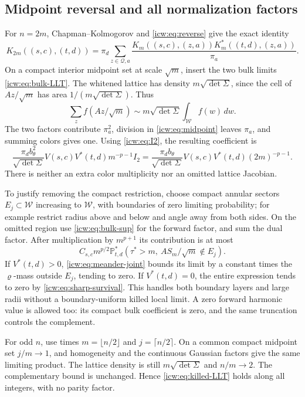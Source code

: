 \documentclass[11pt,letterpaper]{article}
\theoremstyle{remark}\newtheorem{remark}[theorem]{Remark}
\newcommand{\Prob}{\mathbb P}
\newcommand{\Qd}{\mathcal Q}
\newcommand{\1}{\mathbf1}
\newcommand{\Wedge}{\mathcal W}
\newcommand{\dett}{\sqrt{\det\Sigma}}
\begin{document}
\subsection{Midpoint reversal and all normalization factors}
For $n=2m$, Chapman--Kolmogorov and \eqref{icw:eq:reverse} give the exact
identity
\begin{equation}\label{icw:eq:midpoint}
 K_{2m}((s,c),(t,d))
 =\pi_d\sum_{z\in\Qd,a}
 \frac{K_m((s,c),(z,a))K_m^*((t,d),(z,a))}{\pi_a}.
\end{equation}
On a compact interior midpoint set at scale $\sqrt m$, insert the two
bulk limits \eqref{icw:eq:bulk-LLT}. The whitened lattice has density
$m\dett$, since the cell of $Az/\sqrt m$ has area
$1/(m\dett)$. Thus
\[
 \sum_z f(Az/\sqrt m)\sim m\dett\int_{\Wedge}f(w)\,dw.
\]
The two factors contribute $\pi_a^2$, division in
\eqref{icw:eq:midpoint} leaves $\pi_a$, and summing colors gives one.
Using \eqref{icw:eq:I2}, the resulting coefficient is
\[
 \frac{\pi_d b_\theta^2}{\dett}V(s,c)V^*(t,d)
 m^{-p-1}I_2
 =\frac{\pi_d b_\theta}{\dett}V(s,c)V^*(t,d)(2m)^{-p-1}.
\]
There is neither an extra color multiplicity nor an omitted lattice
Jacobian.

To justify removing the compact restriction, choose compact annular
sectors $E_j\subset\Wedge$ increasing to $\Wedge$, with boundaries
of zero limiting probability; for example restrict radius above and
below and angle away from both sides. On the omitted region use
\eqref{icw:eq:bulk-sup} for the forward factor, and sum the dual factor.
After multiplication by $m^{p+1}$ its contribution is at most
\[
 C_{s,c}m^{p/2}
 \Prob^*_{t,d}(\tau^*>m,\ AS_m/\sqrt m\notin E_j).
\]
If $V^*(t,d)>0$, \eqref{icw:eq:meander-joint} bounds its limit by a
constant times the $\varrho$-mass outside $E_j$, tending to zero.
If $V^*(t,d)=0$, the entire expression tends to zero by
\eqref{icw:eq:sharp-survival}. This handles both boundary layers and large
radii without a boundary-uniform killed local limit. A zero forward
harmonic value is allowed too: its compact bulk coefficient is zero,
and the same truncation controls the complement.

For odd $n$, use times $m=\lfloor n/2\rfloor$ and
$j=\lceil n/2\rceil$. On a common compact midpoint set $j/m\to1$,
and homogeneity and the continuous Gaussian factors give the same
limiting product. The lattice density is still $m\dett$ and
$n/m\to2$. The complementary bound is unchanged. Hence
\eqref{icw:eq:killed-LLT} holds along all integers, with no parity factor.
\end{document}

